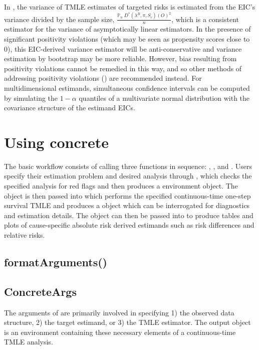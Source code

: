 \documentclass{report}
\newcommand{\1}{\ensuremath{\mathbf{1}}}
\newcommand{\g}{\ensuremath{\pi}}
\begin{document}
In , the variance of TMLE estimates of targeted risks is estimated from the EIC's variance divided by the sample size, \(\frac{\mathbb{P}_n \;D^*( \lambda^B, \g, S_c)(O)^2}{n}\), which is a consistent estimator for the variance of asymptotically linear estimators. In the presence of significant positivity violations (which may be seen as propensity scores close to 0), this EIC-derived variance estimator will be anti-conservative and variance estimation by bootstrap may be more reliable. However, bias resulting from positivity violations cannot be remedied in this way, and so other methods of addressing positivity violations (\cite{petersen_diagnosing_2012}) are recommended instead. For multidimensional estimands, simultaneous confidence intervals can be computed by simulating the \(1 - \alpha\) quantiles of a multivariate normal distribution with the covariance structure of the estimand EICs.

\section{Using concrete}
\label{UsingConcrete}
The basic  workflow consists of calling three functions in sequence: , , and . Users specify their estimation problem and desired analysis through , which checks the specified analysis for red flags and then produces a  environment object. The  object is then passed into  which performs the specified continuous-time one-step survival TMLE and produces a  object which can be interrogated for diagnostics and estimation details. The  object can then be passed into  to produce tables and plots of cause-specific absolute risk derived estimands such as risk differences and relative risks. 


\subsection{formatArguments()}
\label{formatArguments}

\subsection{ConcreteArgs}
\label{sec:orga5407eb}
The arguments of  are primarily involved in specifying 1) the observed data structure, 2) the target estimand, or 3) the TMLE estimator. The output  object is an environment containing these necessary elements of a continuous-time TMLE analysis.
\end{document}
